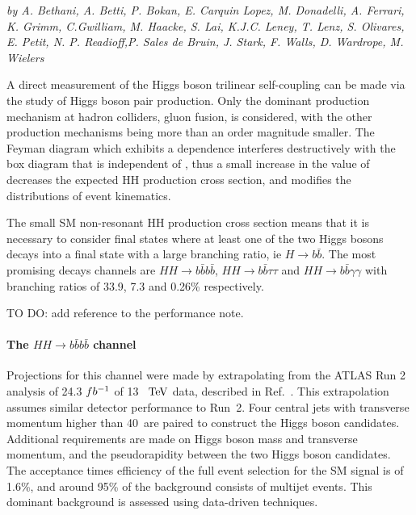 \begin{center}
\textit{by A. Bethani, A. Betti, P. Bokan, E. Carquin Lopez, M. Donadelli, A. Ferrari, K. Grimm, C.Gwilliam, M. Haacke, S. Lai, K.J.C. Leney, T. Lenz, S. Olivares, E. Petit, N. P. Readioff,P. Sales de Bruin, J. Stark, F. Walls, D. Wardrope, M. Wielers}











\end{center}

A direct measurement of the Higgs boson trilinear self-coupling \lHHH can be made via the study of Higgs boson pair production. Only the dominant production mechanism at hadron colliders, gluon fusion, is considered, with the other production mechanisms being more than an order magnitude smaller.
The Feyman diagram which exhibits a \lHHH dependence interferes destructively with the box diagram that is independent of \lHHH , thus a small increase in the value of \lHHH decreases the expected HH production cross section, and modifies the distributions of event kinematics.

The small SM non-resonant HH production cross section means that it is necessary to consider final states where at least one of the two Higgs bosons decays into a final state with a large branching ratio, ie $H \rightarrow b\bar{b}$. The most promising decays channels are $HH \rightarrow b\bar{b}b\bar{b}$, $HH \rightarrow b\bar{b}\tau\tau$ and $HH \rightarrow b\bar{b}\gamma\gamma$ with branching ratios of 33.9, 7.3 and 0.26\% respectively.

TO DO: add reference to the performance note.



%
\paragraph{The $HH \rightarrow b\bar{b}b\bar{b}$ channel}

Projections for this channel were made by extrapolating from the ATLAS Run 2 analysis of 24.3 $fb^{-1}$ of 13~$~\text{TeV}$ data, described in Ref.~\cite{ITKPixelTDR}. This extrapolation assumes similar detector performance to Run~2. Four central jets with transverse momentum higher than 40~\UGeV are paired to construct the Higgs boson candidates. Additional requirements are made on Higgs boson mass and transverse momentum, and the pseudorapidity between the two Higgs boson candidates.
The acceptance times efficiency of the full event selection for the SM signal is of 1.6\%, and around 95\% of the background consists of multijet events. This dominant background is assessed using data-driven techniques. 


